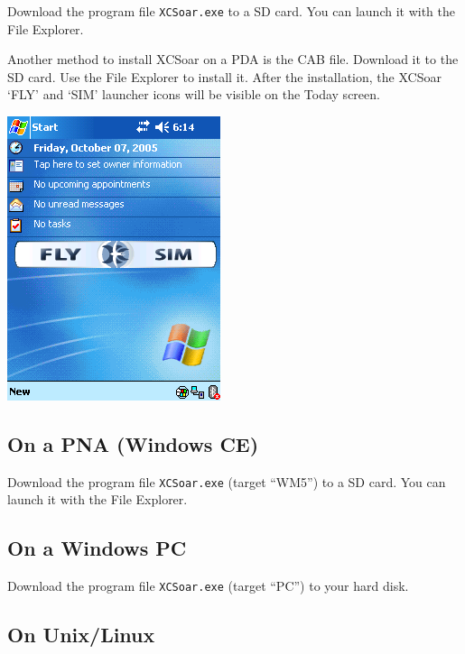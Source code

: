 Download the program file \verb|XCSoar.exe| to a SD card.  You can
launch it with the File Explorer.

Another method to install XCSoar on a PDA is the CAB file.  Download
it to the SD card.  Use the File Explorer to install it.  After the
installation, the XCSoar `FLY' and `SIM' launcher icons will be
visible on the Today screen.

\begin{center}
\includegraphics[angle=0,width=0.6\linewidth,keepaspectratio='true']{figures/XCS_Today.png}
\end{center}

\subsection*{On a PNA (Windows CE)}

Download the program file \verb|XCSoar.exe| (target ``WM5'') to a SD
card.  You can launch it with the File Explorer.

\subsection*{On a Windows PC}

Download the program file \verb|XCSoar.exe| (target ``PC'') to your
hard disk.

\subsection*{On Unix/Linux}

